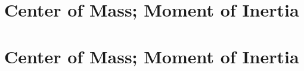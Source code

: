 \def\chapterbody{
  \section{Center of Mass; Moment of Inertia}

  
  
  
  
  
  
}

\ifx\bookmode\undefined
  

  \setcounter{section}{18}

  
    \chapterbody
  
\else
  \chapterbody
\fi
